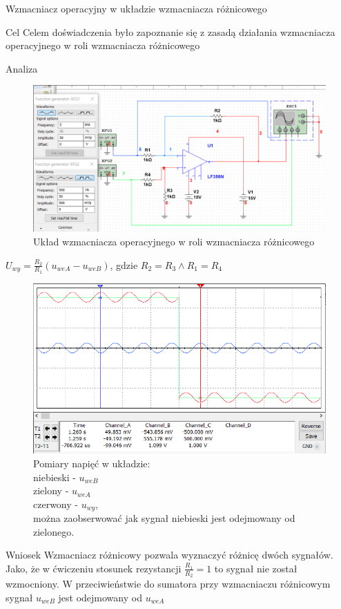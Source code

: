 \documentclass[a4paper]{scrartcl}
\begin{document}
	\begin{section}{Wzmacniacz operacyjny w układzie wzmacniacza różnicowego}
		\begin{subsection}{Cel}
		Celem doświadczenia było zapoznanie się z zasadą działania wzmacniacza operacyjnego w roli wzmacniacza różnicowego
		\end{subsection}
		\begin{subsection}{Analiza}
				\begin{figure}[ht]
				\begin{center}
					\includegraphics[width=0.7\linewidth]{10-circuit}
					\caption{Układ wzmacniacza operacyjnego w roli wzmacniacza różnicowego}
				\end{center}
				\end{figure}
				\begin{center}
				$ U_{wy} = \frac{R_{2}}{R_{1}}(u_{weA} - u_{weB}) $, gdzie $ R_{2} = R_{3} \wedge R_{1} = R_{4} $
				\end{center}
				\begin{figure}[!ht]
				\begin{center}
					\includegraphics[width=0.7\linewidth]{10-osc}
					\caption{Pomiary napięć w układzie:\\niebieski - $u_{weB} $ \\ zielony - $u_{weA}$ \\ czerwony - $u_{wy}$, \\ można zaobserwować jak sygnał niebieski jest odejmowany od zielonego.}
				\end{center}
				\end{figure}
		\end{subsection}
		\begin{subsection}{Wniosek}
			Wzmacniacz różnicowy pozwala wyznaczyć różnicę dwóch sygnałów. Jako, że w ćwiczeniu stosunek rezystancji $\frac{R_{1}}{R_{2}} = 1 $ to sygnał nie został wzmocniony. W przeciwieństwie do sumatora przy wzmacniaczu różnicowym sygnał $u_{weB} $ jest odejmowany od $ u_{weA} $
		\end{subsection}
	\end{section}
\end{document}
